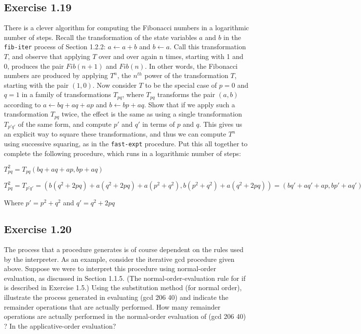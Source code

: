 \documentclass[letterpaper, leqno]{article}
\begin{document}
\subsection*{Exercise 1.19}
There is a clever algorithm for computing the Fibonacci numbers in a logarithmic number of steps. Recall the transformation of the state variables $a$ and $b$ in the \texttt{fib-iter} process of Section 1.2.2: $a \leftarrow a+b$ and $b \leftarrow a$. Call this transformation $T$, and observe that applying $T$ over and over again n times, starting with 1 and 0, produces the pair $Fib(n + 1)$ and $Fib(n)$. In other words, the Fibonacci numbers are produced by applying $T^n$, the $n^{th}$ power of the transformation $T$, starting with the pair $(1, 0)$. Now consider $T$ to be the special case of $p = 0$ and $q = 1$ in a family of transformations $T_{pq}$, where $T_{pq}$ transforms the pair $( a, b )$ according to $a \leftarrow bq + aq + ap$ and $b \leftarrow bp + aq$. Show that if we apply such a transformation $T_{pq}$ twice, the effect is the same as using a single transformation $T_{p'q'}$ of the same form, and compute $p'$ and $q'$ in terms of $p$ and $q$. This gives us an explicit way to square these transformations, and thus we can compute $T^n$ using successive squaring, as in the \texttt{fast-expt} procedure. Put this all together to complete the following procedure, which runs in a logarithmic number of steps:



\textcolor{answer}{
  $T_{pq}^2=T_{pq}(bq+aq+ap, bp+aq)$
}

\bigskip

\textcolor{answer}{
  $T_{pq}^2=T_{p'q'}=(b(q^2+2pq)+a(q^2+2pq)+a(p^2+q^2),b(p^2+q^2)+a(q^2+2pq))=(bq'+aq'+ap, bp'+aq')$
}

\textcolor{answer}{
  Where $p' = p^2+q^2$ and $q'=q^2+2pq$
}



\subsection*{Exercise 1.20}



The process that a procedure generates is of course dependent on the rules used by the interpreter. As an example, consider the iterative gcd procedure given above. Suppose we were to interpret this procedure using normal-order evaluation, as discussed in Section 1.1.5. (The normal-order-evaluation rule for if is described in Exercise 1.5.) Using the substitution method (for normal order), illustrate the process generated in evaluating (gcd 206 40) and indicate the remainder operations that are actually performed. How many remainder operations are actually performed in the normal-order evaluation of (gcd 206 40) ? In the applicative-order evaluation?
\end{document}
